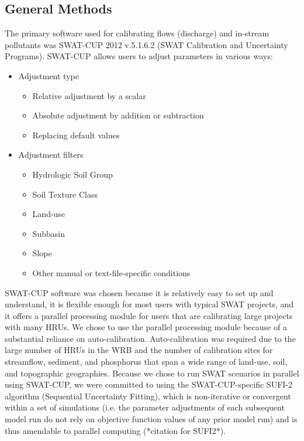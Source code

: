 \subsection{General Methods}

The primary software used for calibrating flows (discharge) and in-stream
pollutants was SWAT-CUP 2012 v.5.1.6.2 (SWAT Calibration and Uncertainty
Programs). SWAT-CUP allows users to adjust parameters in various ways:

\begin{itemize}
  \item Adjustment type
  \begin{itemize}
      \item Relative adjustment by a scalar
      \item Absolute adjustment by addition or subtraction
      \item Replacing default values
  \end{itemize}
  \item Adjustment filters
  \begin{itemize}
      \item Hydrologic Soil Group
      \item Soil Texture Class
      \item Land-use
      \item Subbasin
      \item Slope
      \item Other manual or text-file-specific conditions
   \end{itemize}
\end{itemize}
	
SWAT-CUP software was chosen because it is relatively easy to set up and
understand, it is flexible enough for most users with typical SWAT projects, and
it offers a parallel processing module for users that are calibrating large
projects with many HRUs. We chose to use the parallel processing module because
of a substantial reliance on auto-calibration.
Auto-calibration was required due to the large number of HRUs in the WRB and the
number of calibration sites for streamflow, sediment, and phosphorus that span a
wide range of land-use, soil, and topographic geographies. Because we chose to
run SWAT scenarios in parallel using SWAT-CUP, we were committed to using the
SWAT-CUP-specific SUFI-2 algorithm (Sequential Uncertainty Fitting), which is
non-iterative or convergent within a set of simulations (i.e. the parameter
adjustments of each subsequent model run do not rely on objective function
values of any prior model run) and is thus amendable to parallel
computing (*citation for SUFI2*).

